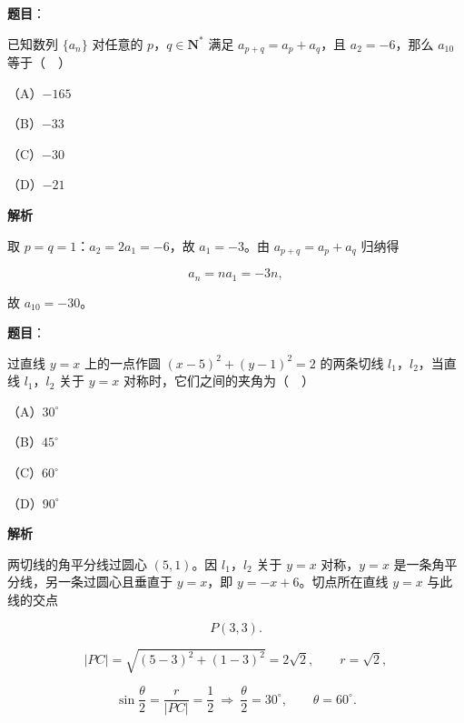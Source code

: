 \begin{answer}

\textbf{题目}：

已知数列 $\{a_n\}$ 对任意的 $p$，$q\in\mathbf N^*$ 满足 $a_{p+q}=a_p+a_q$，且 $a_2=-6$，那么 $a_{10}$ 等于（　）

（A）$-165$

（B）$-33$

（C）$-30$

（D）$-21$

\textbf{解析}

取 $p=q=1$：$a_2=2a_1=-6$，故 $a_1=-3$。由 $a_{p+q}=a_p+a_q$ 归纳得

\nopagebreak[4]
\[a_n=na_1=-3n,\]

故 $a_{10}=-30$。


\end{answer}
\begin{answer}

\textbf{题目}：

过直线 $y=x$ 上的一点作圆 $(x-5)^2+(y-1)^2=2$ 的两条切线 $l_1$，$l_2$，当直线 $l_1$，$l_2$ 关于 $y=x$ 对称时，它们之间的夹角为（　）

（A）$30^\circ$

（B）$45^\circ$

（C）$60^\circ$

（D）$90^\circ$

\textbf{解析}

两切线的角平分线过圆心 $(5,1)$。因 $l_1$，$l_2$ 关于 $y=x$ 对称，$y=x$ 是一条角平分线，另一条过圆心且垂直于 $y=x$，即 $y=-x+6$。切点所在直线 $y=x$ 与此线的交点

\nopagebreak[4]
\[P(3,3).\]

\nopagebreak[4]
\[|PC|=\sqrt{(5-3)^2+(1-3)^2}=2\sqrt2,\qquad r=\sqrt2,\]

\nopagebreak[4]
\[\sin\frac\theta2=\frac r{|PC|}=\frac12\ \Longrightarrow\ \frac\theta2=30^\circ,\qquad \theta=60^\circ.\]


\end{answer}

